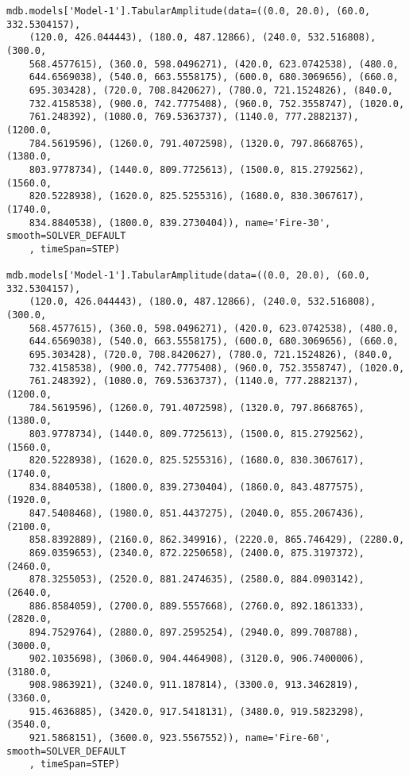 \documentclass[12pt, letterpaper, oneside]{report}
\begin{document}
\begin{lstlisting}[frame=none]
mdb.models['Model-1'].TabularAmplitude(data=((0.0, 20.0), (60.0, 332.5304157), 
    (120.0, 426.044443), (180.0, 487.12866), (240.0, 532.516808), (300.0, 
    568.4577615), (360.0, 598.0496271), (420.0, 623.0742538), (480.0, 
    644.6569038), (540.0, 663.5558175), (600.0, 680.3069656), (660.0, 
    695.303428), (720.0, 708.8420627), (780.0, 721.1524826), (840.0, 
    732.4158538), (900.0, 742.7775408), (960.0, 752.3558747), (1020.0, 
    761.248392), (1080.0, 769.5363737), (1140.0, 777.2882137), (1200.0, 
    784.5619596), (1260.0, 791.4072598), (1320.0, 797.8668765), (1380.0, 
    803.9778734), (1440.0, 809.7725613), (1500.0, 815.2792562), (1560.0, 
    820.5228938), (1620.0, 825.5255316), (1680.0, 830.3067617), (1740.0, 
    834.8840538), (1800.0, 839.2730404)), name='Fire-30', smooth=SOLVER_DEFAULT
    , timeSpan=STEP)
	
mdb.models['Model-1'].TabularAmplitude(data=((0.0, 20.0), (60.0, 332.5304157), 
    (120.0, 426.044443), (180.0, 487.12866), (240.0, 532.516808), (300.0, 
    568.4577615), (360.0, 598.0496271), (420.0, 623.0742538), (480.0, 
    644.6569038), (540.0, 663.5558175), (600.0, 680.3069656), (660.0, 
    695.303428), (720.0, 708.8420627), (780.0, 721.1524826), (840.0, 
    732.4158538), (900.0, 742.7775408), (960.0, 752.3558747), (1020.0, 
    761.248392), (1080.0, 769.5363737), (1140.0, 777.2882137), (1200.0, 
    784.5619596), (1260.0, 791.4072598), (1320.0, 797.8668765), (1380.0, 
    803.9778734), (1440.0, 809.7725613), (1500.0, 815.2792562), (1560.0, 
    820.5228938), (1620.0, 825.5255316), (1680.0, 830.3067617), (1740.0, 
    834.8840538), (1800.0, 839.2730404), (1860.0, 843.4877575), (1920.0, 
    847.5408468), (1980.0, 851.4437275), (2040.0, 855.2067436), (2100.0, 
    858.8392889), (2160.0, 862.349916), (2220.0, 865.746429), (2280.0, 
    869.0359653), (2340.0, 872.2250658), (2400.0, 875.3197372), (2460.0, 
    878.3255053), (2520.0, 881.2474635), (2580.0, 884.0903142), (2640.0, 
    886.8584059), (2700.0, 889.5557668), (2760.0, 892.1861333), (2820.0, 
    894.7529764), (2880.0, 897.2595254), (2940.0, 899.708788), (3000.0, 
    902.1035698), (3060.0, 904.4464908), (3120.0, 906.7400006), (3180.0, 
    908.9863921), (3240.0, 911.187814), (3300.0, 913.3462819), (3360.0, 
    915.4636885), (3420.0, 917.5418131), (3480.0, 919.5823298), (3540.0, 
    921.5868151), (3600.0, 923.5567552)), name='Fire-60', smooth=SOLVER_DEFAULT
    , timeSpan=STEP)
	

\end{lstlisting}
\end{document}
